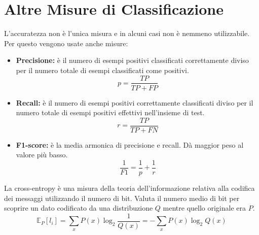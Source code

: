 \section{Altre Misure di Classificazione}
L'accuratezza non è l'unica misura e in alcuni casi non è nemmeno utilizzabile. Per questo vengono usate anche misure:
\begin{itemize}
  \item \textbf{Precisione:} è il numero di esempi positivi classificati correttamente diviso per il numero totale
  di esempi classificati come positivi.
  \[
    p = \frac{TP}{TP + FP}
  \]
  \item \textbf{Recall:} è il numero di esempi positivi correttamente classificati diviso per il numero totale
  di esempi positivi effettivi nell'insieme di test.
  \[
    r = \frac{TP}{TP + FN}
  \]
\item \textbf{F1-score:} è la media armonica di precisione e recall. Dà maggior peso al valore più basso.
\[
  \frac{1}{F1} = \frac{1}{p} + \frac{1}{r}
\]
\end{itemize}

\begin{defn}
  La cross-entropy è una misura della teoria dell'informazione relativa alla codifica dei messaggi utilizzando il numero di bit.
  Valuta il numero medio di bit per scoprire un dato codificato da una distribuzione $Q$ mentre quello originale era $P$.
  \[
    \mathbb{E}_P[l_i] = \sum_x{P(x)\log_2{\frac{1}{Q(x)}}} = - \sum_x{P(x)\log_2{Q(x)}}
  \]
\end{defn}
